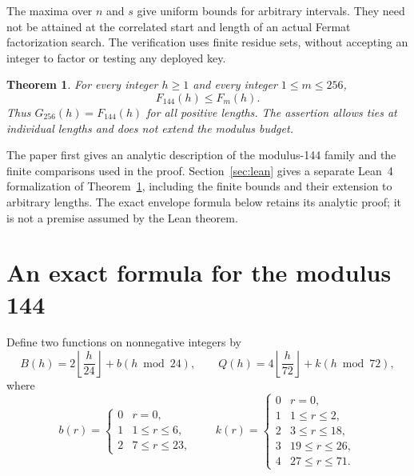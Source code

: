 \documentclass[11pt]{article}
\newtheorem{theorem}{Theorem}
\begin{document}
The maxima over $n$ and $s$ give uniform bounds for arbitrary intervals.
They need not be attained at the correlated start and length of an actual
Fermat factorization search. The verification uses finite residue sets,
without accepting an integer to factor or testing any deployed key.

\begin{theorem}\label{thm:main}
For every integer $h\ge1$ and every integer $1\le m\le256$,
\[
                         F_{144}(h)\le F_m(h).
\]
Thus $G_{256}(h)=F_{144}(h)$ for all positive lengths. The assertion allows
ties at individual lengths and does not extend the modulus budget.
\end{theorem}

The paper first gives an analytic description of the modulus-144 family
and the finite comparisons used in the proof. Section~\ref{sec:lean}
gives a separate Lean~4 formalization of Theorem~\ref{thm:main}, including
the finite bounds and their extension to arbitrary lengths. The exact
envelope formula below retains its analytic proof; it is not a premise
assumed by the Lean theorem.

\section{An exact formula for the modulus 144}

Define two functions on nonnegative integers by
\[
 B(h)=2\left\lfloor\frac h{24}\right\rfloor+b(h\bmod24),\qquad
 Q(h)=4\left\lfloor\frac h{72}\right\rfloor+k(h\bmod72),
\]
where
\[
b(r)=\begin{cases}0&r=0,\\1&1\le r\le6,\\2&7\le r\le23,\end{cases}
\qquad
k(r)=\begin{cases}
0&r=0,\\1&1\le r\le2,\\2&3\le r\le18,\\
3&19\le r\le26,\\4&27\le r\le71.
\end{cases}
\]
\end{document}
